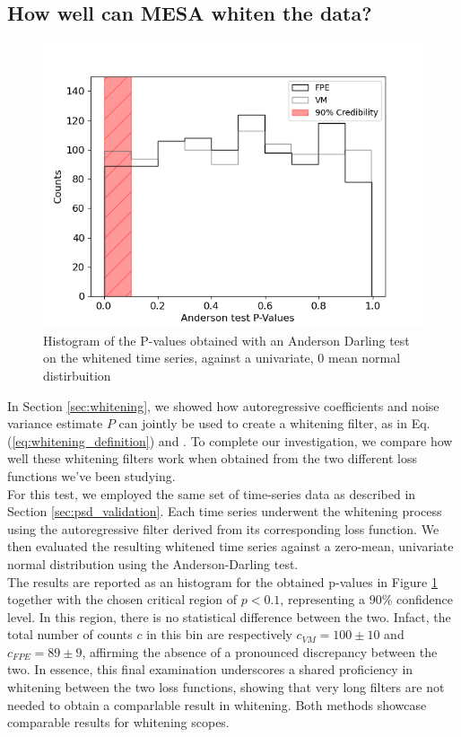 \documentclass[epj,nopacs]{svjour}
\begin{document}
\subsection{How well can MESA whiten the data?}\label{sec:whitening_validation}
\begin{figure}
	\includegraphics[width = \linewidth]{Images/Plots/Anderson_pvalues}
	\caption{Histogram of the P-values obtained with an Anderson Darling test on the whitened time series, against a univariate, 0 mean normal distirbuition}
	\label{fig:whitening}
\end{figure}
In Section \ref{sec:whitening}, we showed how autoregressive coefficients and noise variance estimate $P$ can jointly be used to create a whitening filter, as in Eq. (\ref{eq:whitening_definition}) and . To complete our investigation, we compare how well these whitening filters work when obtained from the two different loss functions we've been studying. \\ 
For this test, we employed the same set of time-series data as described in Section \ref{sec:psd_validation}. Each time series underwent the whitening process using the autoregressive filter derived from its corresponding loss function. We then evaluated the resulting whitened time series against a zero-mean, univariate normal distribution using the Anderson-Darling test. \\
The results are reported as an histogram for the obtained p-values in Figure \ref{fig:whitening} together with the chosen critical region of $p < 0.1$, representing a $90\%$  confidence level. In this region, there is no statistical difference between the two. Infact, the total number of counts $c$ in this bin are respectively $c_{VM} = 100 \pm 10$ and $c_{FPE} = 89 \pm 9$, affirming the absence of a pronounced discrepancy between the two.
In essence, this final examination underscores a shared proficiency in whitening between the two loss functions, showing that very long filters are not needed to obtain a comparlable result in whitening. Both methods showcase comparable results for whitening scopes.\\
\end{document}

